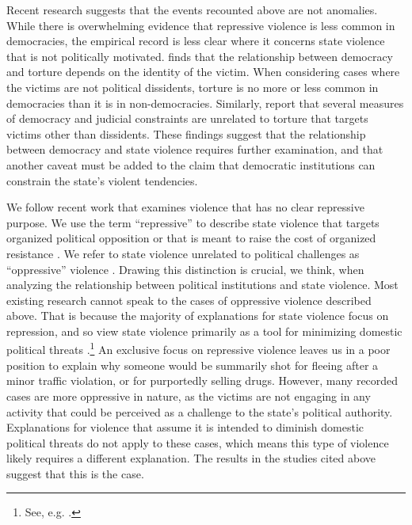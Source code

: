 \documentclass[11pt]{article}
\begin{document}
Recent research suggests that the events recounted above are not anomalies. While there is overwhelming evidence that repressive violence is less common in democracies, the empirical record is less clear where it concerns state violence that is not politically motivated. \citet{Haschke2018} finds that the relationship between democracy and torture depends on the identity of the victim. When considering cases where the victims are not political dissidents, torture is no more or less common in democracies than it is in non-democracies. Similarly, \citet{JacksonHillHall2018} report that several measures of democracy and judicial constraints are unrelated to torture that targets victims other than dissidents. These findings suggest that the relationship between democracy and state violence requires further examination, and that another caveat must be added to the claim that democratic institutions can constrain the state's violent tendencies.     
   
We follow recent work that examines violence that has no clear repressive purpose. We use the term ``repressive'' to describe state violence that targets organized political opposition or that is meant to raise the cost of organized resistance \citep{Bisselletal1978,Tilly1978, Goldstein1978, StohlLopez1984,Davenport2007AR}. We refer to state violence unrelated to political challenges as ``oppressive'' violence \citep{Bisselletal1978}. Drawing this distinction is crucial, we think, when analyzing the relationship between political institutions and state violence. Most existing research cannot speak to the cases of oppressive violence described above. That is because the majority of explanations for state violence focus on repression, and so view state violence primarily as a tool for minimizing domestic political threats \citep{Haschke2018}.\footnote{See, e.g. \citep{Davenport1995,Poe2004,Pierskalla2010,Ritter2014,RitterConrad2016}.} An exclusive focus on repressive violence leaves us in a poor position to explain why someone would be summarily shot for fleeing after a minor traffic violation, or for purportedly selling drugs. However, many recorded cases are more oppressive in nature, as the victims are not engaging in any activity that could be perceived as a challenge to the state's political authority. Explanations for violence that assume it is intended to diminish domestic political threats do not apply to these cases, which means this type of violence likely requires a different explanation. The results in the studies cited above suggest that this is the case.  
\end{document}
